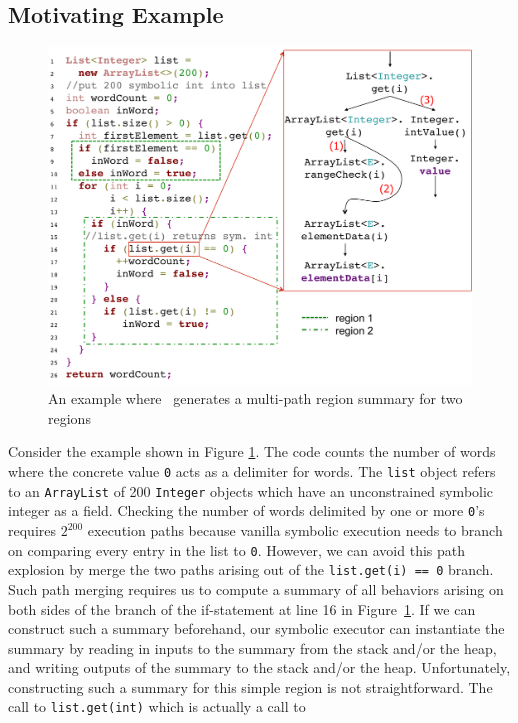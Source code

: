\subsection{Motivating Example}
\begin{figure}
    \includegraphics[width=\columnwidth]{figures/wordCount.pdf}
    \caption{An example where \tool\ generates a multi-path region summary for two regions}
    \label{fig:mot-example}
\end{figure}
Consider the example shown in Figure \ref{fig:mot-example}.
%
The code counts the number of words where the concrete value {\tt 0} acts as a delimiter for words.
%
The {\tt list} object refers to an {\tt ArrayList} of 200 {\tt Integer} objects which have an unconstrained symbolic
integer as a field.
%
Checking the number of words delimited by one or more {\tt 0}\rq s requires $2^{200}$ execution paths because vanilla
symbolic execution needs to branch on comparing every entry in the list to {\tt 0}.
%
However, we can avoid this path explosion by merge the two paths arising out of the {\tt list.get(i) == 0} branch.
%
Such path merging requires us to compute a summary of all behaviors arising on both sides of the branch of the
if-statement at line 16 in Figure~\ref{fig:mot-example}.
%
If we can construct such a summary beforehand, our symbolic executor can instantiate the summary by reading in inputs to
the summary from the stack and/or the heap, and writing outputs of the summary to the stack and/or the heap.
%
Unfortunately, constructing such a summary for this simple region is not straightforward.
%
The call to {\tt list.get(int)} which is actually a call to
